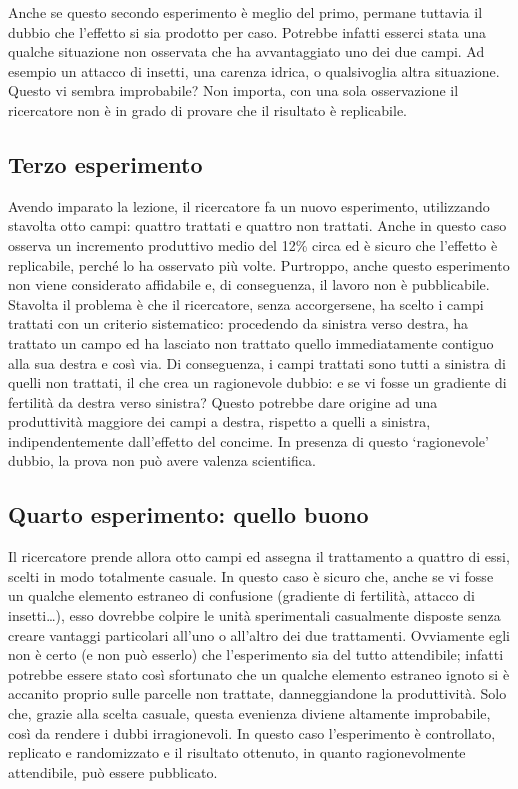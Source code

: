 \documentclass[a4paper,12pt,oneside]{book}
\theoremstyle{definition}
\theoremstyle{definition}
\theoremstyle{definition}
\theoremstyle{remark}
\begin{document}
Anche se questo secondo esperimento è meglio del primo, permane tuttavia
il dubbio che l'effetto si sia prodotto per caso. Potrebbe infatti
esserci stata una qualche situazione non osservata che ha avvantaggiato
uno dei due campi. Ad esempio un attacco di insetti, una carenza idrica,
o qualsivoglia altra situazione. Questo vi sembra improbabile? Non
importa, con una sola osservazione il ricercatore non è in grado di
provare che il risultato è replicabile.

\subsection{Terzo esperimento}\label{terzo-esperimento}

Avendo imparato la lezione, il ricercatore fa un nuovo esperimento,
utilizzando stavolta otto campi: quattro trattati e quattro non
trattati. Anche in questo caso osserva un incremento produttivo medio
del 12\% circa ed è sicuro che l'effetto è replicabile, perché lo ha
osservato più volte. Purtroppo, anche questo esperimento non viene
considerato affidabile e, di conseguenza, il lavoro non è pubblicabile.
Stavolta il problema è che il ricercatore, senza accorgersene, ha scelto
i campi trattati con un criterio sistematico: procedendo da sinistra
verso destra, ha trattato un campo ed ha lasciato non trattato quello
immediatamente contiguo alla sua destra e così via. Di conseguenza, i
campi trattati sono tutti a sinistra di quelli non trattati, il che crea
un ragionevole dubbio: e se vi fosse un gradiente di fertilità da destra
verso sinistra? Questo potrebbe dare origine ad una produttività
maggiore dei campi a destra, rispetto a quelli a sinistra,
indipendentemente dall'effetto del concime. In presenza di questo
`ragionevole' dubbio, la prova non può avere valenza scientifica.

\subsection{Quarto esperimento: quello
buono}\label{quarto-esperimento-quello-buono}

Il ricercatore prende allora otto campi ed assegna il trattamento a
quattro di essi, scelti in modo totalmente casuale. In questo caso è
sicuro che, anche se vi fosse un qualche elemento estraneo di confusione
(gradiente di fertilità, attacco di insetti\ldots{}), esso dovrebbe
colpire le unità sperimentali casualmente disposte senza creare vantaggi
particolari all'uno o all'altro dei due trattamenti. Ovviamente egli non
è certo (e non può esserlo) che l'esperimento sia del tutto attendibile;
infatti potrebbe essere stato così sfortunato che un qualche elemento
estraneo ignoto si è accanito proprio sulle parcelle non trattate,
danneggiandone la produttività. Solo che, grazie alla scelta casuale,
questa evenienza diviene altamente improbabile, così da rendere i dubbi
irragionevoli. In questo caso l'esperimento è controllato, replicato e
randomizzato e il risultato ottenuto, in quanto ragionevolmente
attendibile, può essere pubblicato.
\end{document}
